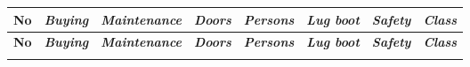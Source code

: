 \footnotesize
\begin{longtable}[c]{cccccccc}

\hline
\textbf{No} & \textit{\textbf{Buying}} & \textit{\textbf{Maintenance}} & \textit{\textbf{Doors}} & \textit{\textbf{Persons}} & \textit{\textbf{Lug boot}} & \textit{\textbf{Safety}} & \textit{\textbf{Class}}\\
\hline
\endfirsthead

\hline
\textbf{No} & \textit{\textbf{Buying}} & \textit{\textbf{Maintenance}} & \textit{\textbf{Doors}} & \textit{\textbf{Persons}} & \textit{\textbf{Lug boot}} & \textit{\textbf{Safety}} & \textit{\textbf{Class}}\\
\hline
\endhead

\hline
\endfoot

\hline
\endlastfoot


\end{longtable}

